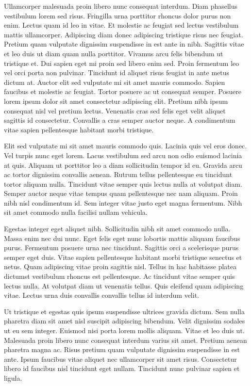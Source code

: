\documentclass[11pt,a4paper]{article}
\begin{document}
Ullamcorper malesuada proin libero nunc consequat interdum. Diam phasellus vestibulum lorem sed risus. Fringilla urna porttitor rhoncus dolor purus non enim. Lectus quam id leo in vitae. Et molestie ac feugiat sed lectus vestibulum mattis ullamcorper. Adipiscing diam donec adipiscing tristique risus nec feugiat. Pretium quam vulputate dignissim suspendisse in est ante in nibh. Sagittis vitae et leo duis ut diam quam nulla porttitor. Vivamus arcu felis bibendum ut tristique et. Dui sapien eget mi proin sed libero enim sed. Proin fermentum leo vel orci porta non pulvinar. Tincidunt id aliquet risus feugiat in ante metus dictum at. Auctor elit sed vulputate mi sit amet mauris commodo. Sapien faucibus et molestie ac feugiat. Tortor posuere ac ut consequat semper. Posuere lorem ipsum dolor sit amet consectetur adipiscing elit. Pretium nibh ipsum consequat nisl vel pretium lectus. Venenatis cras sed felis eget velit aliquet sagittis id consectetur. Convallis a cras semper auctor neque. A condimentum vitae sapien pellentesque habitant morbi tristique.

Elit sed vulputate mi sit amet mauris commodo quis. Lacinia quis vel eros donec. Vel turpis nunc eget lorem. Lacus vestibulum sed arcu non odio euismod lacinia at quis. Aliquam ut porttitor leo a diam sollicitudin tempor id eu. Gravida arcu ac tortor dignissim convallis aenean. Rutrum tellus pellentesque eu tincidunt tortor aliquam nulla. Tincidunt vitae semper quis lectus nulla at volutpat diam. Semper auctor neque vitae tempus quam pellentesque nec nam aliquam. Proin nibh nisl condimentum id. Sem integer vitae justo eget magna fermentum. Nibh sit amet commodo nulla facilisi nullam vehicula.

Egestas integer eget aliquet nibh. Sollicitudin nibh sit amet commodo nulla. Massa enim nec dui nunc. Eget felis eget nunc lobortis mattis aliquam faucibus purus. Fermentum posuere urna nec tincidunt. Sagittis orci a scelerisque purus semper eget duis. Vitae sapien pellentesque habitant morbi tristique senectus et netus. Quam adipiscing vitae proin sagittis nisl. Tellus in hac habitasse platea dictumst vestibulum rhoncus est pellentesque. Ac tincidunt vitae semper quis lectus nulla. At volutpat diam ut venenatis tellus. Quis eleifend quam adipiscing vitae. Lectus urna duis convallis convallis tellus id interdum velit.

Ut tristique et egestas quis ipsum suspendisse ultrices gravida dictum. Sem nulla pharetra diam sit amet nisl suscipit adipiscing bibendum. Velit dignissim sodales ut eu sem integer. Euismod nisi porta lorem mollis aliquam. Vitae et leo duis ut. Malesuada proin libero nunc consequat interdum varius sit amet. Pretium aenean pharetra magna ac. Risus pretium quam vulputate dignissim suspendisse in est ante. Ipsum faucibus vitae aliquet nec ullamcorper sit amet risus. Consectetur libero id faucibus nisl tincidunt eget nullam. Tincidunt nunc pulvinar sapien et ligula.
\end{document}
